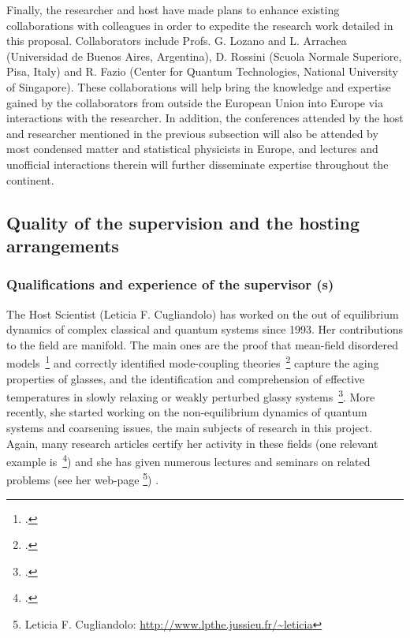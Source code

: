 \documentclass[a4paper,11pt]{article}
\begin{document}
Finally, the researcher and host have made plans to enhance existing collaborations with colleagues in order to expedite the research work detailed in this proposal. Collaborators include  Profs. G. Lozano and L. Arrachea (Universidad de Buenos Aires, Argentina), D. Rossini (Scuola Normale Superiore, Pisa, Italy) and R. Fazio (Center for Quantum Technologies, National University of Singapore). These collaborations will help bring the knowledge and expertise gained by the collaborators from outside the European Union into Europe via interactions with the researcher. In addition, the conferences attended by the host and researcher mentioned in the previous subsection will also be attended by most condensed matter and statistical physicists in Europe, and lectures and unofficial interactions therein will further disseminate expertise throughout the continent.


\subsection{Quality of the supervision and the hosting arrangements}
\label{sec:excellence-supervision}
\subsubsection{Qualifications and experience of the supervisor (s)}

The Host Scientist (Leticia F. Cugliandolo) has worked on the out of equilibrium dynamics of complex classical and quantum 
systems since 1993. Her contributions to the field are manifold. The main ones are the proof that mean-field disordered models~\footcite{glassy} and correctly identified mode-coupling theories~\footcite{Bocukume} capture the aging properties of glasses, and the identification and comprehension of 
effective temperatures in slowly relaxing or weakly perturbed glassy systems~\footcite{Cukupe}. More recently, she started working on 
the non-equilibrium dynamics of quantum systems and coarsening issues, the main subjects of research in this project. Again, many research 
articles certify her activity in these fields (one relevant example is~\footcite{Focuga}) and she has given numerous lectures and seminars
on related problems (see her web-page \footnote{Leticia F. Cugliandolo: \url{http://www.lpthe.jussieu.fr/~leticia}}) .
\end{document}

